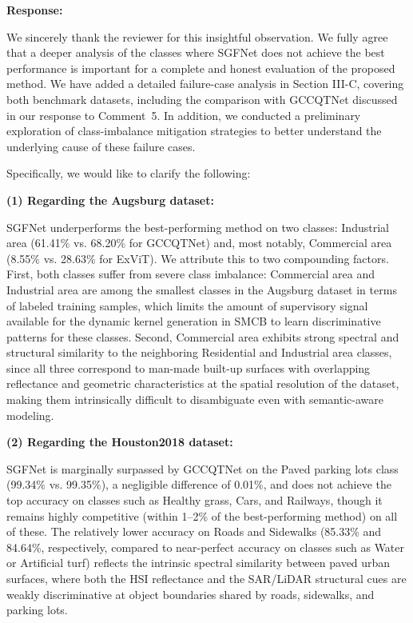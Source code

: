 \textbf{Response:}

We sincerely thank the reviewer for this insightful observation. We fully agree that a deeper analysis of the classes where SGFNet does not achieve the best performance is important for a complete and honest evaluation of the proposed method. We have added a detailed failure-case analysis in Section III-C, covering both benchmark datasets, including the comparison with GCCQTNet discussed in our response to Comment~5. In addition, we conducted a preliminary exploration of class-imbalance mitigation strategies to better understand the underlying cause of these failure cases.

Specifically, we would like to clarify the following:

\textbf{(1) Regarding the Augsburg dataset:}

SGFNet underperforms the best-performing method on two classes: Industrial area (61.41\% vs. 68.20\% for GCCQTNet) and, most notably, Commercial area (8.55\% vs. 28.63\% for ExViT). We attribute this to two compounding factors. First, both classes suffer from severe class imbalance: Commercial area and Industrial area are among the smallest classes in the Augsburg dataset in terms of labeled training samples, which limits the amount of supervisory signal available for the dynamic kernel generation in SMCB to learn discriminative patterns for these classes. Second, Commercial area exhibits strong spectral and structural similarity to the neighboring Residential and Industrial area classes, since all three correspond to man-made built-up surfaces with overlapping reflectance and geometric characteristics at the spatial resolution of the dataset, making them intrinsically difficult to disambiguate even with semantic-aware modeling.

\textbf{(2) Regarding the Houston2018 dataset:}

SGFNet is marginally surpassed by GCCQTNet on the Paved parking lots class (99.34\% vs. 99.35\%), a negligible difference of 0.01\%, and does not achieve the top accuracy on classes such as Healthy grass, Cars, and Railways, though it remains highly competitive (within 1--2\% of the best-performing method) on all of these. The relatively lower accuracy on Roads and Sidewalks (85.33\% and 84.64\%, respectively, compared to near-perfect accuracy on classes such as Water or Artificial turf) reflects the intrinsic spectral similarity between paved urban surfaces, where both the HSI reflectance and the SAR/LiDAR structural cues are weakly discriminative at object boundaries shared by roads, sidewalks, and parking lots.

